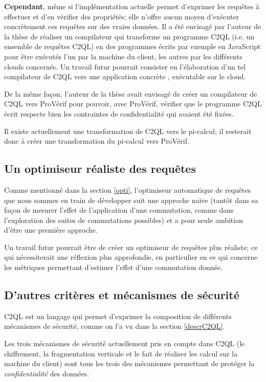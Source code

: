 \textbf{Cependant}, même si l'implémentation
actuelle permet d'exprimer les requêtes à effectuer
et d'en vérifier des propriétés; elle n'offre aucun moyen
d'exécuter concrètement ces requêtes sur des
vraies données.
Il a été envisagé par l'auteur de la thèse
de réaliser un compilateur qui transforme un programme
C2QL (i.e. un ensemble de requêtes C2QL) en
des programmes écrits par exemple en JavaScript
pour être exécutés l'un par la machine du client,
les autres par les différents clouds concernés.
Un travail futur pourrait consister en l'élaboration
d'un tel compilateur de C2QL vers une application
\og concrète \fg{}, exécutable sur le cloud.

De la même façon,
l'auteur de la thèse avait envisagé de
créer un \og compilateur \fg{} de C2QL vers
ProVérif pour pouvoir, avec ProVérif,
vérifier que le programme C2QL écrit respecte bien
les contraintes de confidentialité qui avaient été fixées.

Il existe actuellement une transformation de
C2QL vers le pi-calcul; il resterait donc
à créer une transformation du pi-calcul vers ProVérif.

\subsection*{Un optimiseur réaliste des requêtes}
Comme mentionné dans la section \ref{opti},
l'optimiseur automatique de requêtes
que nous sommes en train de développer 
suit une approche naïve (tantôt dans sa façon de
mesurer l'effet de l'application d'une commutation, 
comme dans l'exploration des suites de commutations
possibles) et a pour seule ambition d'être une
première approche.

Un travail futur pourrait être de créer un optimiseur
de requêtes plus réaliste; ce qui nécessiterait
une réflexion plus approfondie, en particulier
en ce qui concerne les métriques permettant d'estimer
l'effet d'une commutation donnée.

\subsection*{D'autres critères et mécanismes de sécurité}
C2QL est un langage qui permet d'exprimer la composition 
de différents mécanismes de sécurité, comme on l'a vu dans
la section \ref{descrC2QL}.

Les trois mécanismes de sécurité actuellement
pris en compte dans C2QL
(le chiffrement, la fragmentation verticale
et le fait de réaliser les calcul sur
la machine du client)
sont tous les trois des mécanismes permettant
de protéger la \emph{confidentialité} des données.


